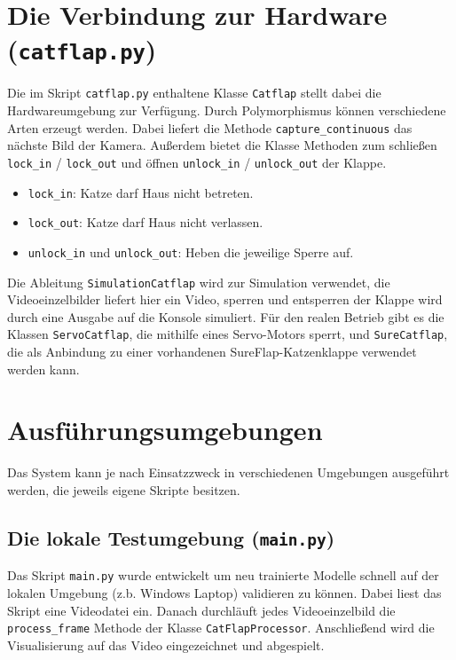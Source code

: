 \section{Die Verbindung zur Hardware (\texttt{catflap.py})}
Die im Skript \texttt{catflap.py} enthaltene Klasse \texttt{Catflap} stellt dabei die Hardwareumgebung zur Verfügung. Durch Polymorphismus können verschiedene Arten erzeugt werden. Dabei liefert die Methode \texttt{capture\_continuous} das nächste Bild der Kamera. Außerdem bietet die Klasse Methoden zum schließen \texttt{lock\_in} / \texttt{lock\_out} und öffnen \texttt{unlock\_in} / \texttt{unlock\_out} der Klappe.

\begin{itemize}
	\item \texttt{lock\_in}: Katze darf Haus nicht betreten.
	\item \texttt{lock\_out}: Katze darf Haus nicht verlassen.
	\item \texttt{unlock\_in} und \texttt{unlock\_out}: Heben die jeweilige Sperre auf.
\end{itemize}

Die Ableitung \texttt{SimulationCatflap} wird zur Simulation verwendet, die Videoeinzelbilder liefert hier ein Video, sperren und entsperren der Klappe wird durch eine Ausgabe auf die Konsole simuliert. Für den realen Betrieb gibt es die Klassen \texttt{ServoCatflap}, die mithilfe eines Servo-Motors sperrt, und \texttt{SureCatflap}, die als Anbindung zu einer vorhandenen SureFlap-Katzenklappe \cite{surepetcare_microchip} verwendet werden kann.

\section{Ausführungsumgebungen}
Das System kann je nach Einsatzzweck in verschiedenen Umgebungen ausgeführt werden, die jeweils eigene Skripte besitzen.

\subsection{Die lokale Testumgebung (\texttt{main.py})}
Das Skript \texttt{main.py} wurde entwickelt um neu trainierte Modelle schnell auf der lokalen Umgebung (z.b. Windows Laptop) validieren zu können. Dabei liest das Skript eine Videodatei ein. Danach durchläuft jedes Videoeinzelbild die \texttt{process\_frame} Methode der Klasse \texttt{CatFlapProcessor}. Anschließend wird die Visualisierung auf das Video eingezeichnet und abgespielt.

